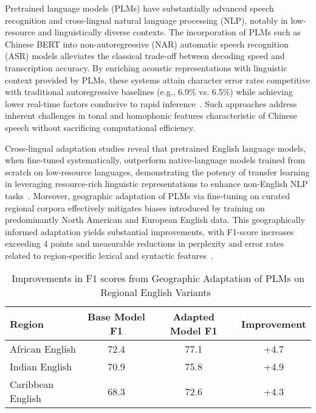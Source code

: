 \documentclass[sigconf]{acmart}
\begin{document}
Pretrained language models (PLMs) have substantially advanced speech recognition and cross-lingual natural language processing (NLP), notably in low-resource and linguistically diverse contexts. The incorporation of PLMs such as Chinese BERT into non-autoregressive (NAR) automatic speech recognition (ASR) models alleviates the classical trade-off between decoding speed and transcription accuracy. By enriching acoustic representations with linguistic context provided by PLMs, these systems attain character error rates competitive with traditional autoregressive baselines (e.g., 6.9\% vs. 6.5\%) while achieving lower real-time factors conducive to rapid inference~\cite{ref32}. Such approaches address inherent challenges in tonal and homophonic features characteristic of Chinese speech without sacrificing computational efficiency.

Cross-lingual adaptation studies reveal that pretrained English language models, when fine-tuned systematically, outperform native-language models trained from scratch on low-resource languages, demonstrating the potency of transfer learning in leveraging resource-rich linguistic representations to enhance non-English NLP tasks~\cite{ref31}. Moreover, geographic adaptation of PLMs via fine-tuning on curated regional corpora effectively mitigates biases introduced by training on predominantly North American and European English data. This geographically informed adaptation yields substantial improvements, with F1-score increases exceeding 4 points and measurable reductions in perplexity and error rates related to region-specific lexical and syntactic features~\cite{ref30}.

\begin{table*}[htbp]
\centering
\caption{Improvements in F1 scores from Geographic Adaptation of PLMs on Regional English Variants~\cite{ref30}}
\label{tab:geo_adapt_f1}
\begin{adjustbox}{max width=\textwidth}
\begin{tabular}{@{}lccc@{}}
\toprule
Region & Base Model F1 & Adapted Model F1 & Improvement \\ \midrule
African English & 72.4 & 77.1 & +4.7 \\
Indian English & 70.9 & 75.8 & +4.9 \\
Caribbean English & 68.3 & 72.6 & +4.3 \\ \bottomrule
\end{tabular}
\end{adjustbox}
\end{table*}
\end{document}
